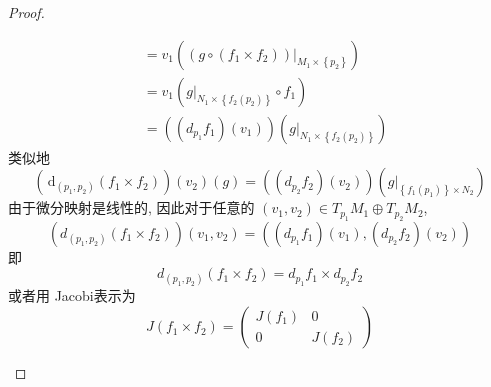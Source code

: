 \documentclass[../main.tex]{subfiles}
\begin{document}
\begin{proof}
\begin{enumerate}
\[\begin{aligned}
        &= v_1\left( \left( g\circ \left( f_1\times f_2 \right)  \right)|_{M_1\times \left\{ p_2 \right\}}  \right) \\ 
         &= v_1\left( g|_{N_1\times \left\{ f_2\left( p_2 \right)  \right\}} \circ f_1\right) \\ 
          &= \left( \left( d _{p_1}f_1 \right)\left( v_1 \right)   \right)\left( g|_{N_1\times \left\{ f_2\left( p_2 \right)  \right\}} \right)  
        \end{aligned}
        \]类似地 \[
        \left( \,\mathrm{d}  _{\left( p_1,p_2 \right) }\left( f_1\times f_2 \right)  \right) \left( v_2 \right)\left( g \right)= \left( \left( d _{p_2}f_2 \right)\left( v_2 \right)   \right)\left( g| _{\left\{ f_1\left( p_1 \right)  \right\}\times N_2} \right)    
        \]由于微分映射是线性的, 因此对于任意的 \(  \left( v_1,v_2 \right)\in T_{p_1}M_1\oplus T_{p_2}M_2   \), \[
        \left( d _{\left( p_1,p_2 \right) }\left( f_1\times f_2 \right)  \right)\left( v_1, v_2 \right)= \left( \left( d _{p_1}f_1 \right)\left( v_1 \right),  \left( d _{p_2}f_2 \right)\left( v_2 \right)       \right) 
        \] 即 \[
        d _{\left( p_1,p_2 \right) }\left( f_1\times f_2 \right)=  d _{p_1}f_1\times  d _{p_2}f_2 
        \]或者用 Jacobi表示为 \[
        J\left( f_1\times f_2 \right)= \begin{pmatrix} 
            J\left( f_1 \right)&0\\ 
             0&J\left( f_2 \right)   
        \end{pmatrix}  
        \]
    \end{enumerate}
    
\end{proof}
\end{document}
